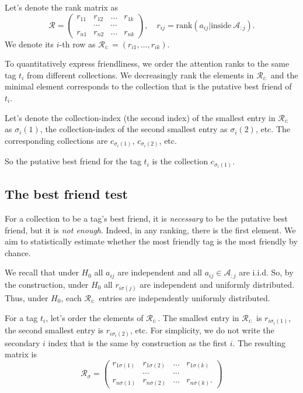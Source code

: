 \documentclass{llncs}
\begin{document}
Let's denote the rank matrix as 
\begin{equation}
\label{def:R}
\mathcal{R} = \begin{pmatrix}
r_{11} & r_{12} & \dots & r_{1k} \\
       &\cdots & \cdots &  \\
r_{n1} & r_{n2} & \dots & r_{nk}
\end{pmatrix}, 
\quad
r_{ij} =\text{rank}\left(a_{ij}|\text{inside}~\mathcal{A}_{:j}\right).
\end{equation}
We denote its $i$-th row as $\mathcal{R}_{i:} = (r_{i1}, \dots, r_{ik})$.

To quantitatively express friendliness, we order the attention ranks to the same tag $t_i$ from different collections. We decreasingly rank the elements in $\mathcal{R}_{i:}$ and the minimal element
corresponds to the collection that is the putative best friend of $t_i$.

Let's denote the collection-index (the second index) of the smallest entry in $\mathcal{R}_{i:}$ as $\sigma_i(1)$, the collection-index of the second smallest entry as ${\sigma_i(2)}$, etc. The corresponding collections are $c_{\sigma_{i}(1)}$, $c_{\sigma_{i}(2)}$, etc. 

So the putative best friend for the tag $t_i$ is the collection $c_{\sigma_{i}(1)}$.

\subsection{The best friend test}
\label{sec:best_friend_test}

For a collection to be a tag's best friend, it is \textit{necessary} to be the putative best friend, but it is \textit{not enough}. Indeed, in any ranking, there is the first element. We aim to statistically estimate whether the most friendly tag is the most friendly by chance. 

We recall that under $H_0$ all $a_{ij}$ are independent and all $a_{ij} \in \mathcal{A}_{:j}$ are i.i.d. So, by the construction, under $H_0$ all $r_{i\sigma(j)}$ are independent and uniformly distributed.
Thus, under $H_0$, each $\mathcal{R}_{i:}$ entries are independently uniformly distributed. 

For a tag $t_i$, let's order the elements of $\mathcal{R}_{i:}$. The smallest entry in $\mathcal{R}_{i:}$ is $r_{i\sigma_i(1)}$, the second smallest entry is $r_{i\sigma_i(2)}$, etc. For simplicity, we do not write the secondary $i$ index that is the same by construction as the first $i$. The resulting matrix is 
\begin{equation}
\label{def:R_sigma}
\mathcal{R}_{\sigma} = \begin{pmatrix}
r_{1\sigma(1)} & r_{1\sigma(2)} & \dots & r_{1\sigma(k)} \\
       &\cdots & \cdots &  \\
r_{n\sigma(1)} & r_{n\sigma(2)} & \dots & r_{n\sigma(k)}.
\end{pmatrix}
\end{equation}
\end{document}
